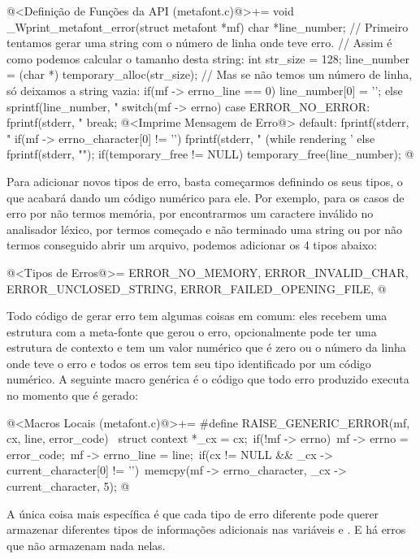 \iniciocodigo
@<Definição de Funções da API (metafont.c)@>+=
void _Wprint_metafont_error(struct metafont *mf){
  char *line_number;
  // Primeiro tentamos gerar uma string com o número de linha onde teve erro.
  // Assim é como podemos calcular o tamanho desta string:
  int str_size = 128;
  line_number = (char *) temporary_alloc(str_size);
  // Mas se não temos um número de linha, só deixamos a string vazia:
  if(mf -> errno_line == 0)
    line_number[0] = '\0';
  else
    sprintf(line_number, "%
  switch(mf -> errno){
  case ERROR_NO_ERROR:
    fprintf(stderr, "%
    break;
  @<Imprime Mensagem de Erro@>
  default:
    fprintf(stderr, "%
  }
  if(mf -> errno_character[0] != '\0'){
    fprintf(stderr, " (while rendering '%
  }
  else
    fprintf(stderr, "\n");
  if(temporary_free != NULL)
    temporary_free(line_number);
}
@
\fimcodigo

Para adicionar novos tipos de erro, basta começarmos definindo os seus
tipos, o que acabará dando um código numérico para ele. Por exemplo,
para os casos de erro por não termos memória, por encontrarmos um
caractere inválido no analisador léxico, por termos começado e não
terminado uma string ou por não termos conseguido abrir um arquivo,
podemos adicionar os 4 tipos abaixo:

\iniciocodigo
@<Tipos de Erros@>=
ERROR_NO_MEMORY, ERROR_INVALID_CHAR, ERROR_UNCLOSED_STRING,
ERROR_FAILED_OPENING_FILE,
@
\fimcodigo

Todo código de gerar erro tem algumas coisas em comum: eles recebem
uma estrutura com a meta-fonte que gerou o erro, opcionalmente pode
ter uma estrutura de contexto e tem um valor numérico que é zero ou o
número da linha onde teve o erro e todos os erros tem seu tipo
identificado por um código numérico. A seguinte macro genérica é o
código que todo erro produzido executa no momento que é gerado:

\iniciocodigo
@<Macros Locais (metafont.c)@>+=
#define RAISE_GENERIC_ERROR(mf, cx, line, error_code) {\
  struct context *_cx = cx;\
  if(!mf -> errno){\
    mf -> errno = error_code;\
    mf -> errno_line = line;\
    if(cx != NULL && _cx -> current_character[0] != '\0')\
      memcpy(mf -> errno_character, _cx -> current_character, 5);}}
@
\fimcodigo

A única coisa mais específica é que cada tipo de erro diferente pode
querer armazenar diferentes tipos de informações adicionais nas
variáveis \monoespaco{errno\_str} e \monoespaco{errno\_int}. E há
erros que não armazenam nada nelas.

